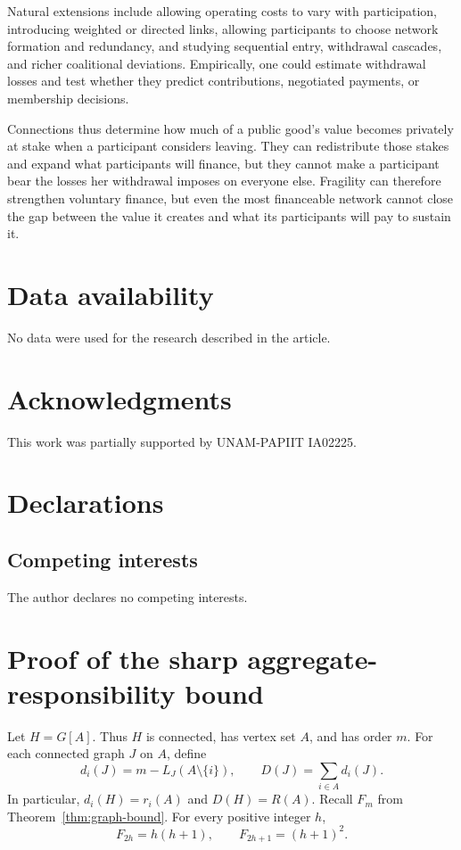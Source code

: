 \documentclass[preprint,12pt,authoryear]{elsarticle}
\newcommand{\LCC}{L}
\begin{document}
Natural extensions include allowing operating costs to vary with participation,
introducing weighted or directed links, allowing participants to choose network
formation and redundancy, and studying sequential entry, withdrawal cascades,
and richer coalitional deviations. Empirically, one could estimate withdrawal
losses and test whether they predict contributions, negotiated payments, or
membership decisions.

Connections thus determine how much of a public good's value becomes privately
at stake when a participant considers leaving. They can redistribute those
stakes and expand what participants will finance, but they cannot make a
participant bear the losses her withdrawal imposes on everyone else. Fragility
can therefore strengthen voluntary finance, but even the most financeable
network cannot close the gap between the value it creates and what its
participants will pay to sustain it.


\section*{Data availability}

No data were used for the research described in the article.

\section*{Acknowledgments}

This work was partially supported by UNAM-PAPIIT IA02225.

\section*{Declarations}
\subsection*{Competing interests}

The author declares no competing interests.

\appendix

\section{Proof of the sharp aggregate-responsibility bound}
\label{app:extremal}

Let \(H=G[A]\). Thus \(H\) is connected, has vertex set \(A\), and has order
\(m\). For each connected graph \(J\) on \(A\), define
\[
 d_i(J)=m-\LCC_J(A\setminus\{i\}),
 \qquad
 D(J)=\sum_{i\in A}d_i(J).
\]
In particular, \(d_i(H)=r_i(A)\) and \(D(H)=R(A)\). Recall \(F_m\) from
Theorem~\ref{thm:graph-bound}. For every positive integer \(h\),
\[
 F_{2h}=h(h+1),
 \qquad
 F_{2h+1}=(h+1)^2.
\]
\end{document}
